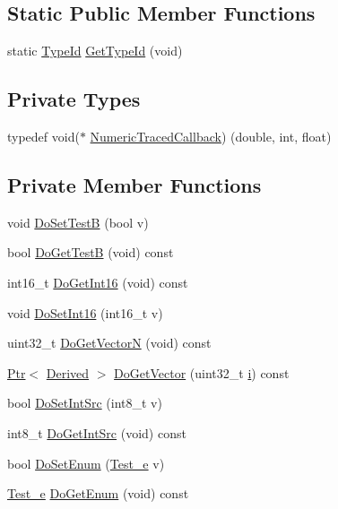 \subsection*{Static Public Member Functions}
\begin{DoxyCompactItemize}
\item 
static \hyperlink{classns3_1_1TypeId}{Type\+Id} \hyperlink{classAttributeObjectTest_a1a3064dae19725ebd81d6da0a74e7021}{Get\+Type\+Id} (void)
\end{DoxyCompactItemize}
\subsection*{Private Types}
\begin{DoxyCompactItemize}
\item 
typedef void($\ast$ \hyperlink{classAttributeObjectTest_a95819796ba72d4f8991c34a0eed7dc6f}{Numeric\+Traced\+Callback}) (double, int, float)
\end{DoxyCompactItemize}
\subsection*{Private Member Functions}
\begin{DoxyCompactItemize}
\item 
void \hyperlink{classAttributeObjectTest_ae4ca4fee1e918fa8865bcaee282e6233}{Do\+Set\+TestB} (bool v)
\item 
bool \hyperlink{classAttributeObjectTest_a0f2e2ca94ae7716ca98810b86e3096c5}{Do\+Get\+TestB} (void) const 
\item 
int16\+\_\+t \hyperlink{classAttributeObjectTest_aab433f15a9f44011ee682d5ede72f19a}{Do\+Get\+Int16} (void) const 
\item 
void \hyperlink{classAttributeObjectTest_af4dd6bc3d3d113055b37cb7d4e1b3e8f}{Do\+Set\+Int16} (int16\+\_\+t v)
\item 
uint32\+\_\+t \hyperlink{classAttributeObjectTest_a1a62c49a2dc2a834e950ac7cb290664f}{Do\+Get\+VectorN} (void) const 
\item 
\hyperlink{classns3_1_1Ptr}{Ptr}$<$ \hyperlink{classDerived}{Derived} $>$ \hyperlink{classAttributeObjectTest_a7d814f72561fbeb1a314c06cc6020a19}{Do\+Get\+Vector} (uint32\+\_\+t \hyperlink{lte__uplink__power__control_8m_a6f6ccfcf58b31cb6412107d9d5281426}{i}) const 
\item 
bool \hyperlink{classAttributeObjectTest_a09baaccde183a0f57322e3eabe5a4e0e}{Do\+Set\+Int\+Src} (int8\+\_\+t v)
\item 
int8\+\_\+t \hyperlink{classAttributeObjectTest_af4e64c6ce08f42309d618592589824d5}{Do\+Get\+Int\+Src} (void) const 
\item 
bool \hyperlink{classAttributeObjectTest_aeb96b221c21f1491ec304d1fe6bbb27c}{Do\+Set\+Enum} (\hyperlink{classAttributeObjectTest_a7d0dfe3f27ac6d9338a92781caf287cb}{Test\+\_\+e} v)
\item 
\hyperlink{classAttributeObjectTest_a7d0dfe3f27ac6d9338a92781caf287cb}{Test\+\_\+e} \hyperlink{classAttributeObjectTest_abfd11b0ee10036e353d08641f3dc3512}{Do\+Get\+Enum} (void) const 
\end{DoxyCompactItemize}
